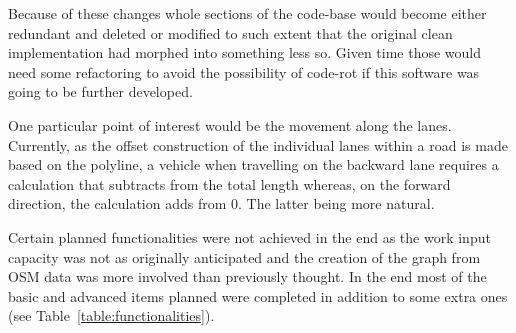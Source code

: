 Because of these changes whole sections of the code-base would become either redundant and deleted or modified to such extent that the original clean implementation had morphed into something less so. Given time those would need some refactoring to avoid the possibility of code-rot if this software was going to be further developed.

One particular point of interest would be the movement along the lanes. Currently, as the offset construction of the individual lanes within a road is made based on the polyline, a vehicle when travelling on the backward lane requires a calculation that subtracts from the total length whereas, on the forward direction, the calculation adds from 0. The latter being more natural.

Certain planned functionalities were not achieved in the end as the work input capacity was not as originally anticipated and the creation of the graph from OSM data was more involved than previously thought. In the end most of the basic and advanced items planned were completed in addition to some extra ones (see Table~\ref{table:functionalities}).


